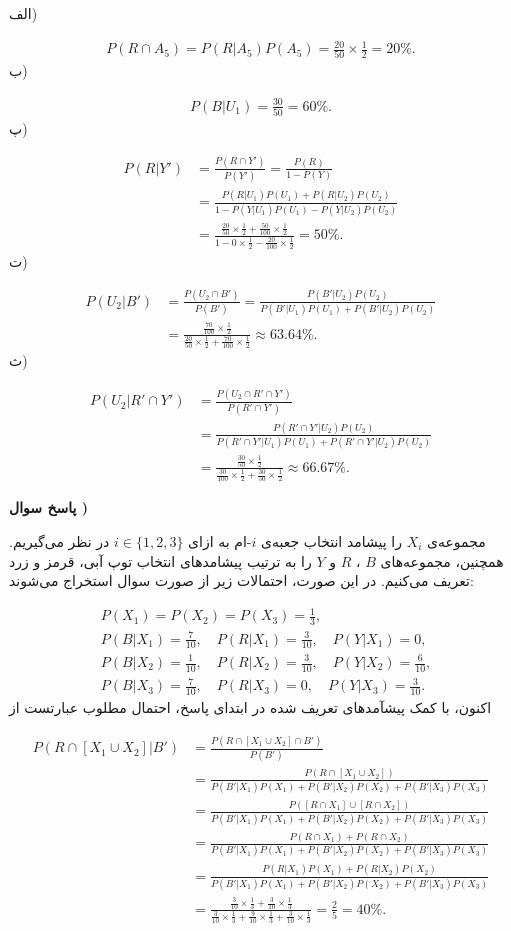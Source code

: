 \documentclass[10pt,letterpaper]{report}
\newcounter{questionanswernumber}
\newcommand{\QA}{
\textbf{پاسخ سوال \thequestionanswernumber)}
\stepcounter{questionanswernumber}
}
\newcommand{\eqn}[1]{
\[\begin{split}
#1
\end{split}\]
}
\begin{document}
الف)
\eqn{
P(R\cap A_5)=P(R|A_5)P(A_5)=\frac{20}{50}\times\frac{1}{2}=20\%.
}{}
ب)
\eqn{
P(B|U_1)=\frac{30}{50}=60\%.
}{}
پ)
\eqn{
P(R|Y')&=\frac{P(R\cap Y')}{P(Y')}=\frac{P(R)}{1-P(Y)}
\\&=\frac{P(R|U_1)P(U_1)+P(R|U_2)P(U_2)}{1-P(Y|U_1)P(U_1)-P(Y|U_2)P(U_2)}
\\&=\frac{\frac{20}{50}\times\frac{1}{2}+\frac{50}{100}\times\frac{1}{2}}{1-0\times\frac{1}{2}-\frac{20}{100}\times\frac{1}{2}}=50\%.
}{}
ت)
\eqn{
P(U_2|B')&=\frac{P(U_2\cap B')}{P(B')}=\frac{P(B'|U_2)P(U_2)}{P(B'|U_1)P(U_1)+P(B'|U_2)P(U_2)}
\\&=\frac{\frac{70}{100}\times\frac{1}{2}}{\frac{20}{50}\times\frac{1}{2}+\frac{70}{100}\times\frac{1}{2}}\approx 63.64\%.
}{}
ث)
\eqn{
P(U_2|R'\cap Y')&=\frac{P(U_2\cap R'\cap Y')}{P(R'\cap Y')}
\\&=\frac{P(R'\cap Y'|U_2)P(U_2)}{P(R'\cap Y'|U_1)P(U_1)+P(R'\cap Y'|U_2)P(U_2)}
\\&=\frac{\frac{30}{50}\times \frac{1}{2}}{\frac{30}{100}\times \frac{1}{2}+\frac{30}{50}\times \frac{1}{2}}\approx 66.67\%.
}{}

\QA

مجموعه‌ی $X_i$ را پیشامد انتخاب جعبه‌ی $i$-ام به ازای $i\in\{1,2,3\}$ در نظر می‌گیریم. همچنین، مجموعه‌های 
$B$
،
$R$
و
$Y$
را به ترتیب پیشامدهای انتخاب توپ آبی، قرمز و زرد تعریف می‌کنیم. در این صورت، احتمالات زیر از صورت سوال استخراج می‌شوند:
\eqn{
&
P(X_1)=P(X_2)=P(X_3)=\frac{1}{3},
\\&
P(B|X_1)=\frac{7}{10},\quad P(R|X_1)=\frac{3}{10},\quad P(Y|X_1)=0,
\\&
P(B|X_2)=\frac{1}{10},\quad P(R|X_2)=\frac{3}{10},\quad P(Y|X_2)=\frac{6}{10},
\\&
P(B|X_3)=\frac{7}{10},\quad P(R|X_3)=0,\quad P(Y|X_3)=\frac{3}{10}.
}{}
اکنون، با کمک پیشآمدهای تعریف شده در ابتدای پاسخ، احتمال مطلوب عبارتست از
\eqn{
P(R\cap[X_1\cup X_2]|B')
&=
\frac{P(R\cap[X_1\cup X_2]\cap B')}{P(B')}
\\&=
\frac{P(R\cap[X_1\cup X_2])}{P(B'|X_1)P(X_1)+P(B'|X_2)P(X_2)+P(B'|X_3)P(X_3)}
\\&=
\frac{P([R\cap X_1]\cup [R\cap X_2])}{P(B'|X_1)P(X_1)+P(B'|X_2)P(X_2)+P(B'|X_3)P(X_3)}
\\&=
\frac{P(R\cap X_1)+P(R\cap X_2)}{P(B'|X_1)P(X_1)+P(B'|X_2)P(X_2)+P(B'|X_3)P(X_3)}
\\&=
\frac{P(R| X_1)P(X_1)+P(R| X_2)P(X_2)}{P(B'|X_1)P(X_1)+P(B'|X_2)P(X_2)+P(B'|X_3)P(X_3)}
\\&=
\frac{\frac{3}{10}\times\frac{1}{3}+\frac{3}{10}\times\frac{1}{3}}{\frac{3}{10}\times\frac{1}{3}+\frac{9}{10}\times\frac{1}{3}+\frac{3}{10}\times\frac{1}{3}}=\frac{2}{5}=40\%.
}{}
\end{document}
